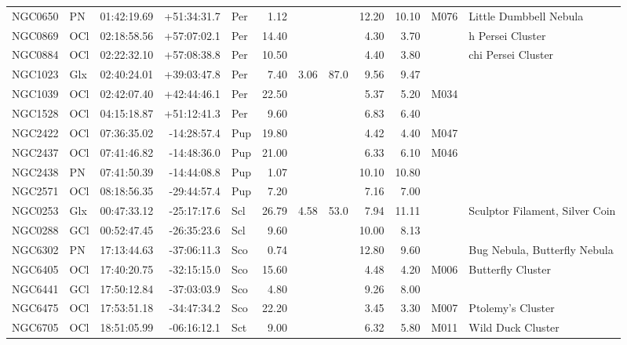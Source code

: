 \documentclass[11pt]{article}
\begin{document}
\begin{longtable}{llrrlrrrrrrl}
  NGC0650 & PN      & 01:42:19.69 & +51:34:31.7 & Per & 1.12   &        &       & 12.20 & 10.10  & M076 & Little Dumbbell Nebula \\
  NGC0869 & OCl     & 02:18:58.56 & +57:07:02.1 & Per & 14.40  &        &       & 4.30  & 3.70   &      & h Persei Cluster \\
  NGC0884 & OCl     & 02:22:32.10 & +57:08:38.8 & Per & 10.50  &        &       & 4.40  & 3.80   &      & chi Persei Cluster \\
  NGC1023 & Glx     & 02:40:24.01 & +39:03:47.8 & Per & 7.40   & 3.06   & 87.0  & 9.56  & 9.47   &      & \\
  NGC1039 & OCl     & 02:42:07.40 & +42:44:46.1 & Per & 22.50  &        &       & 5.37  & 5.20   & M034 & \\
  NGC1528 & OCl     & 04:15:18.87 & +51:12:41.3 & Per & 9.60   &        &       & 6.83  & 6.40   &      & \\
  NGC2422 & OCl     & 07:36:35.02 & -14:28:57.4 & Pup & 19.80  &        &       & 4.42  & 4.40   & M047 & \\
  NGC2437 & OCl     & 07:41:46.82 & -14:48:36.0 & Pup & 21.00  &        &       & 6.33  & 6.10   & M046 & \\
  NGC2438 & PN      & 07:41:50.39 & -14:44:08.8 & Pup & 1.07   &        &       & 10.10 & 10.80  &      & \\
  NGC2571 & OCl     & 08:18:56.35 & -29:44:57.4 & Pup & 7.20   &        &       & 7.16  & 7.00   &      & \\
  NGC0253 & Glx     & 00:47:33.12 & -25:17:17.6 & Scl & 26.79  & 4.58   & 53.0  & 7.94  & 11.11  &      & Sculptor Filament, Silver Coin \\
  NGC0288 & GCl     & 00:52:47.45 & -26:35:23.6 & Scl & 9.60   &        &       & 10.00 & 8.13   &      & \\
  NGC6302 & PN      & 17:13:44.63 & -37:06:11.3 & Sco & 0.74   &        &       & 12.80 & 9.60   &      & Bug Nebula, Butterfly Nebula \\
  NGC6405 & OCl     & 17:40:20.75 & -32:15:15.0 & Sco & 15.60  &        &       & 4.48  & 4.20   & M006 & Butterfly Cluster \\
  NGC6441 & GCl     & 17:50:12.84 & -37:03:03.9 & Sco & 4.80   &        &       & 9.26  & 8.00   &      & \\
  NGC6475 & OCl     & 17:53:51.18 & -34:47:34.2 & Sco & 22.20  &        &       & 3.45  & 3.30   & M007 & Ptolemy's Cluster \\
  NGC6705 & OCl     & 18:51:05.99 & -06:16:12.1 & Sct & 9.00   &        &       & 6.32  & 5.80   & M011 & Wild Duck Cluster \\

\end{longtable}
\end{document}
